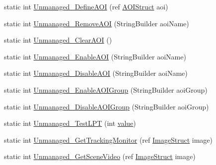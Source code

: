 \begin{DoxyCompactItemize}
\item 
static int \hyperlink{class_web_analyzer_1_1_eye_tracking_1_1_eye_tracking_controller_a1d5f98c4186fa28db12b18b207aae696}{Unmanaged\+\_\+\+Define\+A\+O\+I} (ref \hyperlink{struct_web_analyzer_1_1_eye_tracking_1_1_eye_tracking_controller_1_1_a_o_i_struct}{A\+O\+I\+Struct} aoi)
\item 
static int \hyperlink{class_web_analyzer_1_1_eye_tracking_1_1_eye_tracking_controller_a01019c44a253be09fa6de4bc98f1534e}{Unmanaged\+\_\+\+Remove\+A\+O\+I} (String\+Builder aoi\+Name)
\item 
static int \hyperlink{class_web_analyzer_1_1_eye_tracking_1_1_eye_tracking_controller_a38720589317d0729316fa91a59a7918b}{Unmanaged\+\_\+\+Clear\+A\+O\+I} ()
\item 
static int \hyperlink{class_web_analyzer_1_1_eye_tracking_1_1_eye_tracking_controller_a1a7e497a44e3a6236792c612b2c152d2}{Unmanaged\+\_\+\+Enable\+A\+O\+I} (String\+Builder aoi\+Name)
\item 
static int \hyperlink{class_web_analyzer_1_1_eye_tracking_1_1_eye_tracking_controller_ab5eae4192ee419315d3e3ec66c39751b}{Unmanaged\+\_\+\+Disable\+A\+O\+I} (String\+Builder aoi\+Name)
\item 
static int \hyperlink{class_web_analyzer_1_1_eye_tracking_1_1_eye_tracking_controller_a13f58d7a20d5cadf4df101aed77edc79}{Unmanaged\+\_\+\+Enable\+A\+O\+I\+Group} (String\+Builder aoi\+Group)
\item 
static int \hyperlink{class_web_analyzer_1_1_eye_tracking_1_1_eye_tracking_controller_a16c971b44ce5393bb6d1708797aea042}{Unmanaged\+\_\+\+Disable\+A\+O\+I\+Group} (String\+Builder aoi\+Group)
\item 
static int \hyperlink{class_web_analyzer_1_1_eye_tracking_1_1_eye_tracking_controller_ac1c4e9d9082e0546c48cad6823c319c9}{Unmanaged\+\_\+\+Test\+L\+P\+T} (int \hyperlink{_u_i_2_h_t_m_l_resources_2js_2lib_2underscore_8min_8js_af7e1471ab89699458c4df8bb657298f6}{value})
\item 
static int \hyperlink{class_web_analyzer_1_1_eye_tracking_1_1_eye_tracking_controller_a71951dcf6c03a480a95930ee3c13364b}{Unmanaged\+\_\+\+Get\+Tracking\+Monitor} (ref \hyperlink{struct_web_analyzer_1_1_eye_tracking_1_1_eye_tracking_controller_1_1_image_struct}{Image\+Struct} image)
\item 
static int \hyperlink{class_web_analyzer_1_1_eye_tracking_1_1_eye_tracking_controller_a81e39700f1c2074fa46d674a52ae742c}{Unmanaged\+\_\+\+Get\+Scene\+Video} (ref \hyperlink{struct_web_analyzer_1_1_eye_tracking_1_1_eye_tracking_controller_1_1_image_struct}{Image\+Struct} image)

\end{DoxyCompactItemize}
